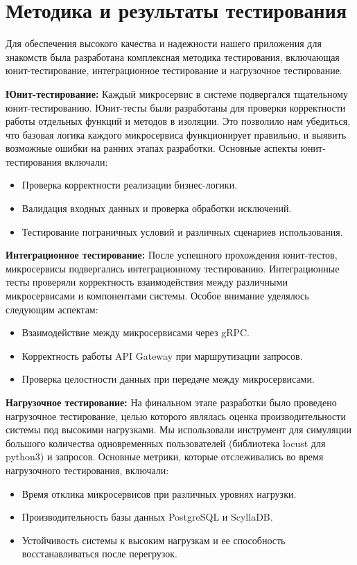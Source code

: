 \section{Методика и результаты тестирования}

Для обеспечения высокого качества и надежности нашего приложения для знакомств была разработана комплексная методика тестирования, включающая юнит-тестирование, интеграционное тестирование и нагрузочное тестирование.

\textbf{Юнит-тестирование:}
Каждый микросервис в системе подвергался тщательному юнит-тестированию. Юнит-тесты были разработаны для проверки корректности работы отдельных функций и методов в изоляции. Это позволило нам убедиться, что базовая логика каждого микросервиса функционирует правильно, и выявить возможные ошибки на ранних этапах разработки. Основные аспекты юнит-тестирования включали:
\begin{itemize}
    \item Проверка корректности реализации бизнес-логики.
    \item Валидация входных данных и проверка обработки исключений.
    \item Тестирование пограничных условий и различных сценариев использования.
\end{itemize}

\textbf{Интеграционное тестирование:}
После успешного прохождения юнит-тестов, микросервисы подвергались интеграционному тестированию. Интеграционные тесты проверяли корректность взаимодействия между различными микросервисами и компонентами системы. Особое внимание уделялось следующим аспектам:
\begin{itemize}
    \item Взаимодействие между микросервисами через gRPC.
    \item Корректность работы API Gateway при маршрутизации запросов.
    \item Проверка целостности данных при передаче между микросервисами.
\end{itemize}

\textbf{Нагрузочное тестирование:}
На финальном этапе разработки было проведено нагрузочное тестирование, целью которого являлась оценка производительности системы под высокими нагрузками. Мы использовали инструмент для симуляции большого количества одновременных пользователей (библиотека locust для python3) и запросов. Основные метрики, которые отслеживались во время нагрузочного тестирования, включали:
\begin{itemize}
    \item Время отклика микросервисов при различных уровнях нагрузки.
    \item Производительность базы данных PostgreSQL и ScyllaDB.
    \item Устойчивость системы к высоким нагрузкам и ее способность восстанавливаться после перегрузок.
\end{itemize}

